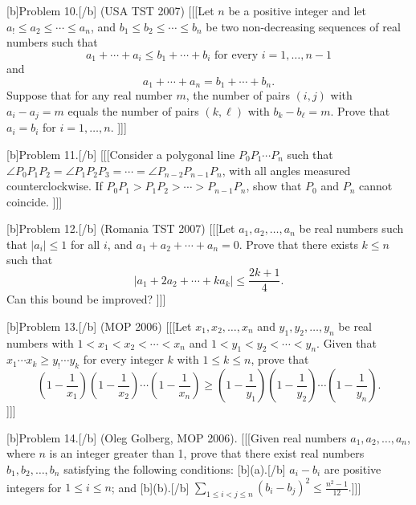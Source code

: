 [b]Problem 10.[/b] (USA TST 2007) [[[Let $n$ be a positive integer and let $a_! \leq a_2 \leq \cdots \leq a_n$, and $b_1 \leq b_2 \leq \cdots \leq b_n$ be two non-decreasing sequences of real numbers such that  
\[ a_1 + \cdots + a_i \leq b_1 + \cdots + b_i \text{ for every } i = 1, \ldots, n-1 \]  
and  
\[ a_1 + \cdots + a_n = b_1 + \cdots + b_n. \]  
Suppose that for any real number $m$, the number of pairs $(i,j)$ with $a_i - a_j = m$ equals the number of pairs $(k, \ell)$ with $b_k - b_{\ell} = m$. Prove that $a_i = b_i$ for $i = 1, \ldots, n$.  ]]]

[b]Problem 11.[/b] [[[Consider a polygonal line $P_0 P_1 \cdots P_n$ such that $\angle P_0 P_1 P_2 = \angle P_1 P_2 P_3 = \cdots = \angle P_{n-2} P_{n-1} P_n$, with all angles measured counterclockwise. If $P_0 P_1 > P_1 P_2 > \cdots > P_{n-1} P_n$, show that $P_0$ and $P_n$ cannot coincide.  ]]]

[b]Problem 12.[/b] (Romania TST 2007) [[[Let $a_1, a_2, \ldots, a_n$ be real numbers such that $|a_i| \leq 1$ for all $i$, and $a_1 + a_2 + \cdots + a_n = 0$. Prove that there exists $k \leq n$ such that  
\[ |a_1 + 2a_2 + \cdots + k a_k| \leq \frac{2k+1}{4}. \]  
Can this bound be improved?  ]]]

[b]Problem 13.[/b] (MOP 2006) [[[Let $x_1, x_2, \ldots, x_n$ and $y_1, y_2, \ldots, y_n$ be real numbers with $1 < x_1 < x_2 < \cdots < x_n$ and $1 < y_1 < y_2 < \cdots < y_n$. Given that $x_1 \cdots x_k \geq y_! \cdots y_k$ for every integer $k$ with $1 \leq k \leq n$, prove that 
\[ \left(1 - \frac{1}{x_1} \right)\left(1 - \frac{1}{x_2} \right) \cdots \left(1 - \frac{1}{x_n} \right) \geq \left(1 - \frac{1}{y_1} \right)\left(1 - \frac{1}{y_2} \right) \cdots \left(1 - \frac{1}{y_n} \right). \]  ]]]

[b]Problem 14.[/b] (Oleg Golberg, MOP 2006). [[[Given real numbers $a_1, a_2, \ldots, a_n$, where $n$ is an integer greater than 1, prove that there exist real numbers $b_1, b_2, \ldots, b_n$ satisfying the following conditions:  
[b](a).[/b] $a_i - b_i$ are positive integers for $1 \leq i \leq n$; and  
[b](b).[/b] $\sum_{1 \leq i < j \leq n} (b_i - b_j)^2 \leq \frac{n^2 - 1}{12}. $]]]